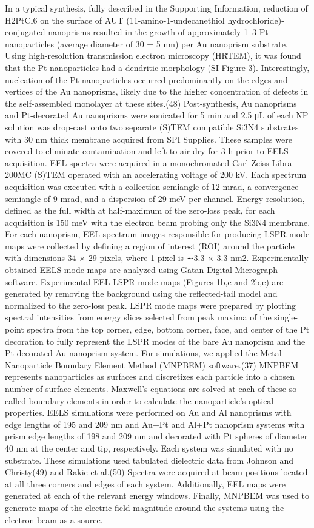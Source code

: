 \documentclass [11pt, proquest] {uwthesis}[2016/11/22]
\begin{document}
In a typical synthesis, fully described in the Supporting Information, reduction of H2PtCl6 on the surface of AUT (11-amino-1-undecanethiol hydrochloride)-conjugated nanoprisms resulted in the growth of approximately 1–3 Pt nanoparticles (average diameter of 30 ± 5 nm) per Au nanoprism substrate. Using high-resolution transmission electron microscopy (HRTEM), it was found that the Pt nanoparticles had a dendritic morphology (SI Figure 3). Interestingly, nucleation of the Pt nanoparticles occurred predominantly on the edges and vertices of the Au nanoprisms, likely due to the higher concentration of defects in the self-assembled monolayer at these sites.(48)
Post-synthesis, Au nanoprisms and Pt-decorated Au nanoprisms were sonicated for 5 min and 2.5 μL of each NP solution was drop-cast onto two separate (S)TEM compatible Si3N4 substrates with 30 nm thick membrane acquired from SPI Supplies. These samples were covered to eliminate contamination and left to air-dry for 3 h prior to EELS acquisition. EEL spectra were acquired in a monochromated Carl Zeiss Libra 200MC (S)TEM operated with an accelerating voltage of 200 kV. Each spectrum acquisition was executed with a collection semiangle of 12 mrad, a convergence semiangle of 9 mrad, and a dispersion of 29 meV per channel. Energy resolution, defined as the full width at half-maximum of the zero-loss peak, for each acquisition is 150 meV with the electron beam probing only the Si3N4 membrane. For each nanoprism, EEL spectrum images responsible for producing LSPR mode maps were collected by defining a region of interest (ROI) around the particle with dimensions 34 × 29 pixels, where 1 pixel is ∼3.3 × 3.3 nm2.
Experimentally obtained EELS mode maps are analyzed using Gatan Digital Micrograph software. Experimental EEL LSPR mode maps (Figures 1b,e and 2b,e) are generated by removing the background using the reflected-tail model and normalized to the zero-loss peak. LSPR mode maps were prepared by plotting spectral intensities from energy slices selected from peak maxima of the single-point spectra from the top corner, edge, bottom corner, face, and center of the Pt decoration to fully represent the LSPR modes of the bare Au nanoprism and the Pt-decorated Au nanoprism system.
For simulations, we applied the Metal Nanoparticle Boundary Element Method (MNPBEM) software.(37) MNPBEM represents nanoparticles as surfaces and discretizes each particle into a chosen number of surface elements. Maxwell’s equations are solved at each of these so-called boundary elements in order to calculate the nanoparticle’s optical properties. EELS simulations were performed on Au and Al nanoprisms with edge lengths of 195 and 209 nm and Au+Pt and Al+Pt nanoprism systems with prism edge lengths of 198 and 209 nm and decorated with Pt spheres of diameter 40 nm at the center and tip, respectively. Each system was simulated with no substrate. These simulations used tabulated dielectric data from Johnson and Christy(49) and Rakic et al.(50) Spectra were acquired at beam positions located at all three corners and edges of each system. Additionally, EEL maps were generated at each of the relevant energy windows. Finally, MNPBEM was used to generate maps of the electric field magnitude around the systems using the electron beam as a source.
\end{document}
